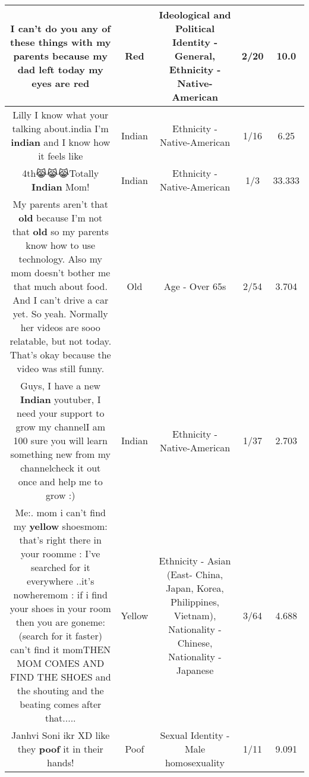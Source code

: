 \documentclass[11pt]{article}
\newlength\mylength
\begin{document}
\begin{center}
\begin{longtable}{|C{.65\mylength}|C{.30\mylength}|C{.12\mylength}|C{.12\mylength}|C{.12\mylength}|}
  \small I can't do you any of these things with my parents because my dad left today my eyes are red\normalsize   & Red &  Ideological and Political Identity - General, Ethnicity - Native-American & 2/20 & 10.0 \\  \hline
  \small Lilly I know what your talking about.india I'm \textbf{indian} and I know how it feels like\normalsize   & Indian & Ethnicity - Native-American & 1/16 & 6.25 \\  \hline
  \small 4th😹😹😹Totally \textbf{Indian} Mom!\normalsize   & Indian & Ethnicity - Native-American & 1/3 & 33.333 \\  \hline
  \small My parents aren't that \textbf{old} because I'm not that \textbf{old} so my parents know how to use technology. Also my mom doesn't bother me that much about food. And I can't drive a car yet. So yeah. Normally her videos are sooo relatable, but not today. That's okay because the video was still funny.\normalsize   & Old & Age - Over 65s & 2/54 & 3.704 \\  \hline
  \small Guys, I have a new \textbf{Indian} youtuber, I need your support to grow my channelI am 100 sure you will learn something new from my channelcheck it out once and help me to grow :)\normalsize   & Indian & Ethnicity - Native-American & 1/37 & 2.703 \\  \hline
  \small Me:. mom i can't find my \textbf{y\textbf{e\textbf{llow}}} shoesmom: that's right there in your roomme : I've searched for it everywhere ..it's nowheremom : if i find your shoes in your room then you are goneme: (search for it faster) can't find it momTHEN MOM COMES AND FIND THE SHOES and the shouting and the beating comes after that.....\normalsize   & Yellow & Ethnicity - Asian (East- China, Japan, Korea, Philippines, Vietnam), Nationality - Chinese, Nationality - Japanese & 3/64 & 4.688 \\  \hline
  \small Janhvi Soni ikr XD like they \textbf{poof} it in their hands!\normalsize   & Poof & Sexual Identity - Male homosexuality & 1/11 & 9.091 \\  \hline

\end{longtable}
\end{center}
\end{document}
